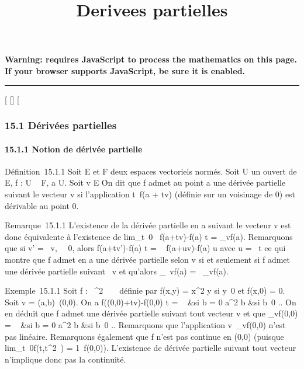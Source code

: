 \documentclass[]{article}
\title{Derivees partielles}
\author{}
\date{}
\begin{document}
\maketitle

\textbf{Warning: 
requires JavaScript to process the mathematics on this page.\\ If your
browser supports JavaScript, be sure it is enabled.}

\begin{center}\rule{3in}{0.4pt}\end{center}

{[}
{[}{]}
{[}

\subsubsection{15.1 Dérivées partielles}

\paragraph{15.1.1 Notion de dérivée partielle}

Définition~15.1.1 Soit E et F deux espaces vectoriels normés. Soit U un
ouvert de E, f : U \rightarrow~ F, a \in U. Soit v \in E
\diagdown\0\. On dit que f admet au point a
une dérivée partielle suivant le vecteur v si l'application
t\mapsto~f(a + tv) (définie sur un voisinage de 0)
est dérivable au point 0.

Remarque~15.1.1 L'existence de la dérivée partielle en a suivant le
vecteur v est donc équivalente à l'existence de
lim_t\rightarrow~0~ f(a+tv)-f(a)
\over t = \partial_vf(a). Remarquons que si v' = \lambda~v,
\lambda~\neq~0, alors  f(a+tv')-f(a)
\over t = \lambda~ f(a+uv)-f(a) \over u
avec u = \lambda~t ce qui montre que f admet en a une dérivée partielle selon v
si et seulement si f admet une dérivée partielle suivant \lambda~v et qu'alors
\partial_\lambda~vf(a) = \lambda~\partial_vf(a).

Exemple~15.1.1 Soit f : ~^2 \rightarrow~ ~ définie par f(x,y) =
x^2 \over y si
y\neq~0 et f(x,0) = 0. Soit v =
(a,b)\neq~(0,0). On a  f((0,0)+tv)-f(0,0)
\over t = \left \
 &si b = 0 \cr 
a^2 \over b &si
b\neq~0  \right .. On en déduit
que f admet une dérivée partielle suivant tout vecteur v et que
\partial_vf(0,0) = \left \
 &si b = 0 \cr 
a^2 \over b &si
b\neq~0  \right .. Remarquons
que l'application v\mapsto~\partial_vf(0,0) n'est
pas linéaire. Remarquons également que f n'est pas continue en (0,0)
(puisque lim_t\rightarrow~0f(t,t^2~) =
1\neq~f(0,0)). L'existence de dérivée partielle
suivant tout vecteur n'implique donc pas la continuité.
\end{document}
